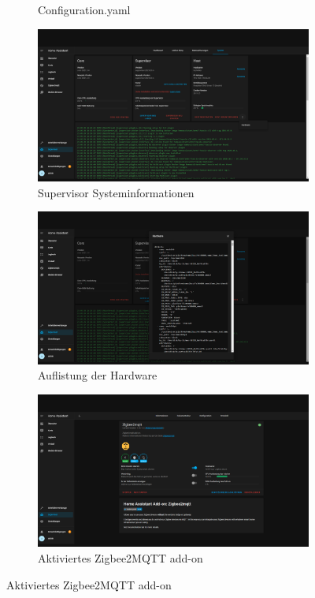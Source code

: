 \begin{figure}[H]
\begin{subfigure}{.5\linewidth}
        \caption{Configuration.yaml}
        \label{fig:ha18}
    \end{subfigure}
    \begin{subfigure}{.5\linewidth}
        \includegraphics[width=1\textwidth]{img/HA23.png}
        \caption{Supervisor Systeminformationen}
        \label{fig:ha19}
    \end{subfigure}
    \begin{subfigure}{.5\linewidth}
        \includegraphics[width=1\textwidth]{img/HA24.png}
        \caption{Auflistung der Hardware}
        \label{fig:ha20}
    \end{subfigure}
    \begin{subfigure}{.5\linewidth}
        \includegraphics[width=1\textwidth]{img/HA21.png}
        \caption{Aktiviertes Zigbee2MQTT add-on}
        \label{fig:ha17}
    \end{subfigure}
\end{figure}

